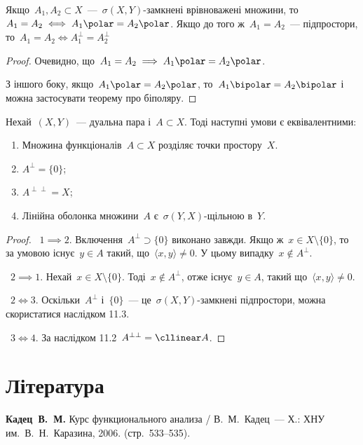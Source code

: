 \begin{corollary}
    Якщо~$A_1, A_2 \subset X$~---~$\sigma(X, Y)$-замкнені врівноважені множини, то~$A_1 = A_2 \iff A_1\polar = A_2\polar$. Якщо до того ж~$A_1 = A_2$~--- підпростори, то~$A_1 = A_2 \iff A_1^\perp = A_2^\perp$
\end{corollary}

\begin{proof}
    Очевидно, що~$A_1 = A_2 \implies A_1\polar = A_2\polar$.
    
    З іншого боку, якщо~$A_1\polar = A_2\polar$, то~$A_1\bipolar = A_2\bipolar$ і можна застосувати теорему про біполяру.
\end{proof}

\begin{theorem}
    Нехай~$(X, Y)$~--- дуальна пара і~$A \subset X$.
    Тоді наступні умови є еквівалентними:
    \begin{enumerate}
        \item Множина функціоналів~$A \subset X$ розділяє точки простору~$X$.
        \item $A^\perp = \{0\}$;
        \item $A^{\perp\perp} = X$;
        \item Лінійна оболонка множини~$A$ є~$\sigma(Y, X)$-щільною в~$Y$.
    \end{enumerate}
\end{theorem}

\begin{proof}
   ~$1 \implies 2$. Включення~$A^\perp \supset \{0\}$ виконано завжди. Якщо ж~$x \in X \setminus \{0\}$, то за умовою існує~$y \in A$ такий, що~$\langle x, y \rangle \ne 0$. У цьому випадку~$x \notin A^\perp$.

   ~$2 \implies 1$. Нехай~$x \in X \setminus \{0\}$. Тоді~$x \notin A^\perp$, отже існує~$y \in A$, такий що~$\langle x, y \rangle \ne 0$.

   ~$2 \iff 3$. Оскільки~$A^\perp$ і~$\{0\}$~--- це~$\sigma(X, Y)$-замкнені підпростори, можна скористатися наслідком 11.3.

   ~$3 \iff 4$. За наслідком 11.2~$A^{\perp\perp} = \cllinear A$.
\end{proof}

\section{Література}

\begin{enumerate}[label={[\arabic*]}]
\item \textbf{Кадец~В.~М.}
Курс функционального анализа /
В.~М.~Кадец~---
Х.: ХНУ им.~В.~Н.~Каразина, 2006. (стр.~533--535).
\end{enumerate}

